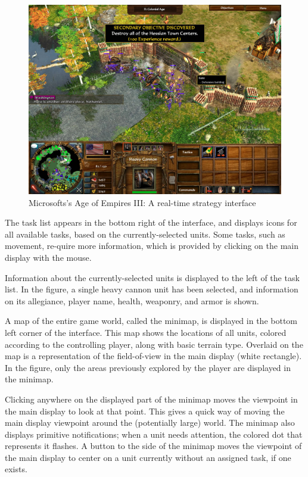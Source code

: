 \begin{figure}[ht]
\begin{center}
\includegraphics[width=6in]{images/age_of_empires_3.jpg}
\caption{Microsofts's Age of Empires III: A real-time strategy interface \label{fig:aoe3}}
\end{center}
\end{figure}


The task list appears in the bottom right of the interface, and displays icons for all available tasks, based on the currently-selected units. Some tasks, such as movement, re-quire more information, which is provided by clicking on the main display with the mouse.

Information about the currently-selected units is displayed to the left of the task list. In the figure, a single heavy cannon unit has been selected, and information on its allegiance, player name, health, weaponry, and armor is shown.

A map of the entire game world, called the minimap, is displayed in the bottom left corner of the interface. This map shows the locations of all units, colored according to the controlling player, along with basic terrain type. Overlaid on the map is a representation of the field-of-view in the main display (white rectangle). In the figure, only the areas previously explored by the player are displayed in the minimap. %

Clicking anywhere on the displayed part of the minimap moves the viewpoint in the main display to look at that point. This gives a quick way of moving the main display viewpoint around the (potentially large) world. The minimap also displays primitive notifications; when a unit needs attention, the colored dot that represents it flashes. A button to the side of the minimap moves the viewpoint of the main display to center on a unit currently without an assigned task, if one exists.

